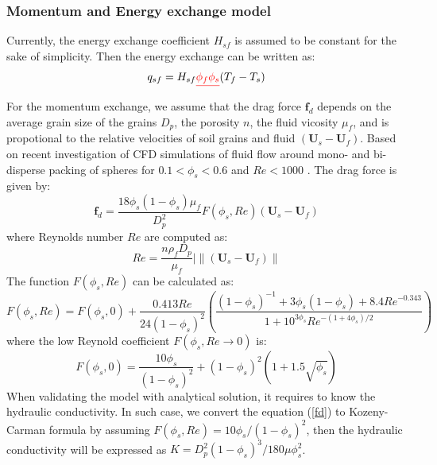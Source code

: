 \documentclass[preprint,12pt]{elsarticle}
\providecommand{\DIFdel}[1]{{\protect\color{red}\sout{#1}}}                      %
\providecommand{\DIFdelbegin}{} %
\providecommand{\DIFdelend}{} %
\newcommand{\DIFscaledelfig}{0.5}
\newlength{\DIFdelgraphicswidth} %
\newlength{\DIFdelgraphicsheight} %
\newcommand{\DIFdelincludegraphics}[2][]{%
\sbox{\DIFdelgraphicsbox}{\DIFOincludegraphics[#1]{#2}}%
\settoboxwidth{\DIFdelgraphicswidth}{\DIFdelgraphicsbox} %
\settoboxtotalheight{\DIFdelgraphicsheight}{\DIFdelgraphicsbox} %
\scalebox{\DIFscaledelfig}{%
\parbox[b]{\DIFdelgraphicswidth}{\usebox{\DIFdelgraphicsbox}\\[-\baselineskip] \rule{\DIFdelgraphicswidth}{0em}}\llap{\resizebox{\DIFdelgraphicswidth}{\DIFdelgraphicsheight}{%
\setlength{\unitlength}{\DIFdelgraphicswidth}%
\begin{picture}(1,1)%
\thicklines\linethickness{2pt} %
{\color[rgb]{1,0,0}\put(0,0){\framebox(1,1){}}}%
{\color[rgb]{1,0,0}\put(0,0){\line( 1,1){1}}}%
{\color[rgb]{1,0,0}\put(0,1){\line(1,-1){1}}}%
\end{picture}%
}\hspace*{3pt}}} %
} %
\DeclareRobustCommand{\DIFdelbegin}{\DIFOdelbegin \let\includegraphics\DIFdelincludegraphics} %
\DeclareRobustCommand{\DIFdelend}{\DIFOaddend \let\includegraphics\DIFOincludegraphics} %
\begin{document}
\subsubsection{Momentum and Energy exchange model}
Currently, the energy exchange coefficient $H_{sf}$ is assumed to be constant for the sake of simplicity. Then the energy exchange can be written as:
%
%
\begin{equation}
     q_{sf} = H_{sf} \DIFdelbegin \DIFdel{\phi_f \phi_s }\DIFdelend (T_f -T_s)
\end{equation}
%
%
For the momentum exchange, we assume that the drag force $\pmb{f}_{d}$ depends on the average grain size of the grains $D_p$, the porosity $n$, the fluid vicosity $\mu_f$, and is propotional to the relative velocities of soil grains and fluid $(\pmb{U}_s - \pmb{U}_f)$. Based on recent investigation of CFD simulations of fluid flow around mono- and bi-disperse packing of spheres for $0.1 < \phi_s < 0.6$ and $Re < 1000$ \cite{Drag}. The drag force is given by: \\
%
%
\begin{equation}
     \pmb{f}_{d} = \frac{18\phi_s(1-\phi_s)\mu_f}{D_p^2} F(\phi_s, Re) (\pmb{U}_s - \pmb{U}_f)  
\label{fd}
\end{equation}
%
%
where Reynolds number $Re$ are computed as:
%
%
\begin{equation}
     Re = \frac{n \rho_f D_p}{\mu_f} |\big\|(\pmb{U}_s - \pmb{U}_f)\big\|
\end{equation}
%
%
The function $F(\phi_s, Re)$ can be calculated as:
%
%
\begin{equation}
     F(\phi_s, Re)  = F(\phi_s, 0)  + \frac{0.413Re}{24 (1-\phi_s)^2} (\frac{(1-\phi_s)^{-1}+3\phi_s(1-\phi_s)+8.4Re^{-0.343}}{1+10^{3\phi_s}Re^{-(1+4\phi_s)/2}})
\end{equation}
%
%
where the low Reynold coefficient $ F(\phi_s, Re\rightarrow0)$ is:
%
%
\begin{equation}
     F(\phi_s, 0)  = \frac{10\phi_s}{ (1-\phi_s)^2}+(1-\phi_s)^2(1+1.5\sqrt{\phi_s})
\end{equation}
%
%
When validating the model with analytical solution, it requires to know the hydraulic conductivity. In such case, we convert the equation (\ref{fd}) to Kozeny-Carman formula by assuming $F(\phi_s, Re) = 10\phi_s/(1-\phi_s)^2$, then the hydraulic conductivity will be expressed as  $K = D_p^2 (1-\phi_s)^3 / 180 \mu \phi_s^2$.
\end{document}

